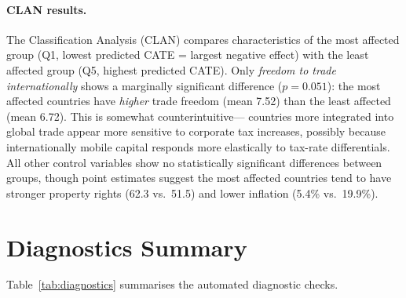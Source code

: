 \documentclass[12pt]{article}
\begin{document}


\paragraph{CLAN results.}
The Classification Analysis (CLAN) compares characteristics of the most affected
group (Q1, lowest predicted CATE = largest negative effect) with the least affected
group (Q5, highest predicted CATE).
Only \textit{freedom to trade internationally} shows a marginally significant
difference ($p = 0.051$): the most affected countries have \emph{higher} trade freedom
(mean 7.52) than the least affected (mean 6.72). This is somewhat counterintuitive---
countries more integrated into global trade appear more sensitive to corporate tax
increases, possibly because internationally mobile capital responds more elastically
to tax-rate differentials. All other control variables show no statistically
significant differences between groups, though point estimates suggest the most
affected countries tend to have stronger property rights (62.3 vs.\ 51.5) and lower
inflation (5.4\% vs.\ 19.9\%).

\section{Diagnostics Summary}

Table~\ref{tab:diagnostics} summarises the automated diagnostic checks.
\end{document}
